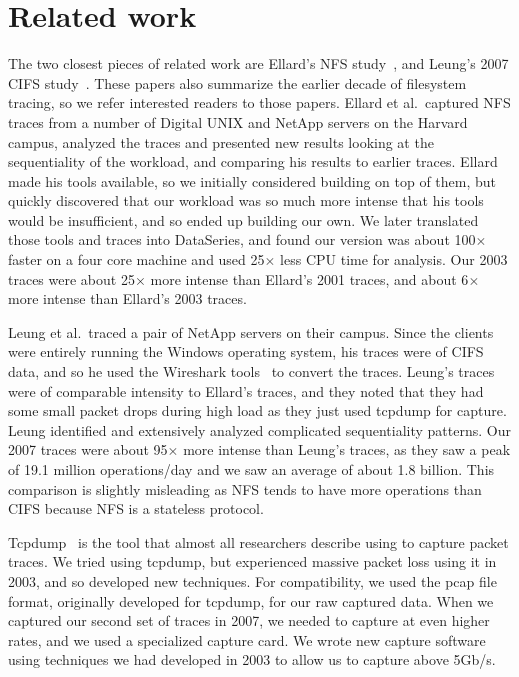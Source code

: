 \section{Related work}
\label{sec:related}

The two closest pieces of related work are Ellard's NFS
study~\cite{EllardFast03,EllardLisa03}, and Leung's 2007 CIFS
study~\cite{LeungUsenix08}.  These papers also summarize the earlier
decade of filesystem tracing, so we refer interested readers to those
papers.  Ellard et al.\ captured NFS traces from a number of Digital
UNIX and NetApp servers on the Harvard campus, analyzed the traces and
presented new results looking at the sequentiality of the workload,
and comparing his results to earlier traces.  Ellard made his tools
available, so we initially considered building on top of them, but
quickly discovered that our workload was so much more intense that his
tools would be insufficient, and so ended up building our own.  We
later translated those tools and traces into DataSeries, and found our
version was about 100$\times$ faster on a four core machine and used
25$\times$ less CPU time for analysis.  Our 2003 traces were about
25$\times$ more intense than Ellard's 2001 traces, and about 6$\times$
more intense than Ellard's 2003 traces.

Leung et al.\ traced a pair of NetApp servers on their campus.
Since the clients were entirely running the Windows operating system, his traces were of
CIFS data, and so he used the Wireshark tools~\cite{wireshark} to
convert the traces.  Leung's traces were of comparable intensity to
Ellard's traces, and they noted that they had some small packet drops
during high load as they just used tcpdump for capture.  Leung identified and extensively analyzed 
complicated sequentiality patterns.
Our 2007 traces were about 95$\times$ more intense than Leung's
traces, as they saw a peak of 19.1 million operations/day and we saw an
average of about 1.8 billion.  This comparison is slightly misleading
as NFS tends to have more operations than CIFS because NFS is a
stateless protocol.

Tcpdump~\cite{tcpdump} is the tool that almost all researchers describe using to capture packet
traces.  We tried using tcpdump, but experienced massive
packet loss using it in 2003, and so developed new techniques.  For
compatibility, we used the pcap file format, originally developed for tcpdump, for our raw captured
data.  When we captured our second set of traces in 2007, we needed to
capture at even higher rates, and we used a
specialized capture card. We wrote new capture software using
techniques we had developed in 2003 to allow us to capture above
5Gb/s.

